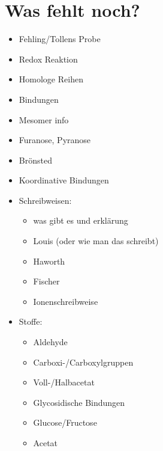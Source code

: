 \chapter{Was fehlt noch?}
\begin{itemize}
    \item Fehling/Tollens Probe
    \item Redox Reaktion
    \item Homologe Reihen
    \item Bindungen
    \item Mesomer info
    \item Furanose, Pyranose
    \item Brönsted
    \item Koordinative Bindungen

    \item Schreibweisen:
    \begin{itemize}
        \item was gibt es und erklärung
        \item Louis (oder wie man das schreibt)
        \item Haworth
        \item Fischer
        \item Ionenschreibweise
    \end{itemize}
    \item Stoffe:
    \begin{itemize}
        \item Aldehyde
        \item Carboxi-/Carboxylgruppen
        \item Voll-/Halbacetat
        \item Glycosidische Bindungen
        \item Glucose/Fructose
        \item Acetat
    \end{itemize}
\end{itemize}
